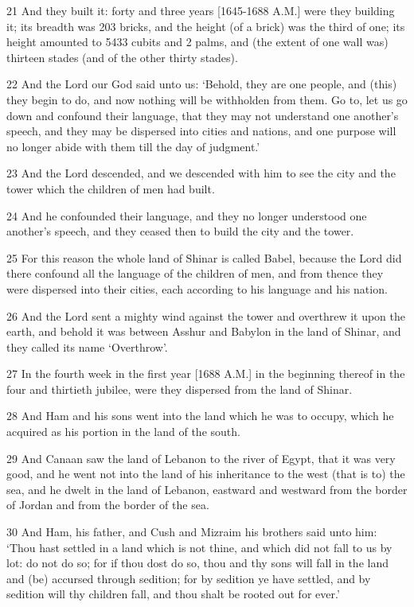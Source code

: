 \par 21 And they built it: forty and three years [1645-1688 A.M.] were they building it; its breadth was 203 bricks, and the height (of a brick) was the third of one; its height amounted to 5433 cubits and 2 palms, and (the extent of one wall was) thirteen stades (and of the other thirty stades).
\par 22 And the Lord our God said unto us: ‘Behold, they are one people, and (this) they begin to do, and now nothing will be withholden from them. Go to, let us go down and confound their language, that they may not understand one another's speech, and they may be dispersed into cities and nations, and one purpose will no longer abide with them till the day of judgment.’
\par 23 And the Lord descended, and we descended with him to see the city and the tower which the children of men had built.
\par 24 And he confounded their language, and they no longer understood one another's speech, and they ceased then to build the city and the tower.
\par 25 For this reason the whole land of Shinar is called Babel, because the Lord did there confound all the language of the children of men, and from thence they were dispersed into their cities, each according to his language and his nation.
\par 26 And the Lord sent a mighty wind against the tower and overthrew it upon the earth, and behold it was between Asshur and Babylon in the land of Shinar, and they called its name ‘Overthrow’.
\par 27 In the fourth week in the first year [1688 A.M.] in the beginning thereof in the four and thirtieth jubilee, were they dispersed from the land of Shinar.
\par 28 And Ham and his sons went into the land which he was to occupy, which he acquired as his portion in the land of the south.
\par 29 And Canaan saw the land of Lebanon to the river of Egypt, that it was very good, and he went not into the land of his inheritance to the west (that is to) the sea, and he dwelt in the land of Lebanon, eastward and westward from the border of Jordan and from the border of the sea.
\par 30 And Ham, his father, and Cush and Mizraim his brothers said unto him: ‘Thou hast settled in a land which is not thine, and which did not fall to us by lot: do not do so; for if thou dost do so, thou and thy sons will fall in the land and (be) accursed through sedition; for by sedition ye have settled, and by sedition will thy children fall, and thou shalt be rooted out for ever.’

